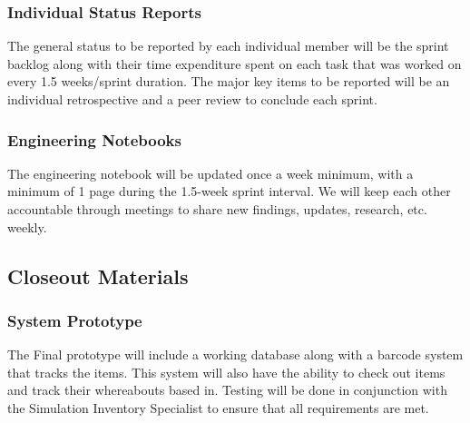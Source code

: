 \subsubsection{Individual Status Reports}
The general status to be reported by each individual member will be the sprint backlog along with their time expenditure spent on each task that was worked on every 1.5 weeks/sprint duration. The major key items to be reported will be an individual retrospective and a peer review to conclude each sprint.

\subsubsection{Engineering Notebooks}
The engineering notebook will be updated once a week minimum, with a minimum of 1 page during the 1.5-week sprint interval. We will keep each other accountable through meetings to share new findings, updates, research, etc. weekly.

\subsection{Closeout Materials}

\subsubsection{System Prototype}
The Final prototype will include a working database along with a barcode system that tracks the items. This system will also have the ability to check out items and track their whereabouts based in. Testing will be done in conjunction with the Simulation Inventory Specialist to ensure that all requirements are met.

